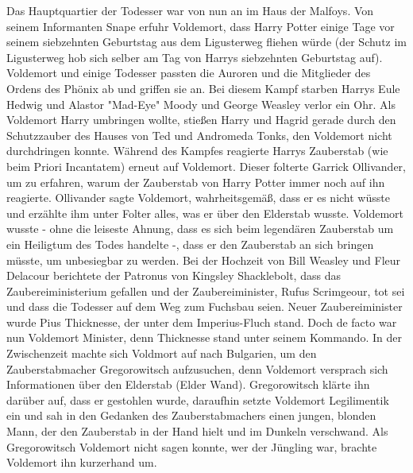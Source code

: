 \documentclass[a4paper, 10pt]{article}
\begin{document}
\newline
Das Hauptquartier der Todesser war von nun an im Haus der Malfoys. Von seinem Informanten Snape erfuhr Voldemort, dass Harry Potter einige Tage vor seinem siebzehnten Geburtstag aus dem Ligusterweg fliehen würde (der Schutz im Ligusterweg hob sich selber am Tag von Harrys siebzehnten Geburtstag auf). Voldemort und einige Todesser passten die Auroren und die Mitglieder des Ordens des Phönix ab und griffen sie an. Bei diesem Kampf starben Harrys Eule Hedwig und Alastor "Mad-Eye" Moody und George Weasley verlor ein Ohr. Als Voldemort Harry umbringen wollte, stießen Harry und Hagrid gerade durch den Schutzzauber des Hauses von Ted und Andromeda Tonks, den Voldemort nicht durchdringen konnte.
\vspace{10pt}
\newline
Während des Kampfes reagierte Harrys Zauberstab (wie beim Priori Incantatem) erneut auf Voldemort. Dieser folterte Garrick Ollivander, um zu erfahren, warum der Zauberstab von Harry Potter immer noch auf ihn reagierte. Ollivander sagte Voldemort, wahrheitsgemäß, dass er es nicht wüsste und erzählte ihm unter Folter alles, was er über den Elderstab wusste. Voldemort wusste - ohne die leiseste Ahnung, dass es sich beim legendären Zauberstab um ein Heiligtum des Todes handelte -, dass er den Zauberstab an sich bringen müsste, um unbesiegbar zu werden.
\vspace{10pt}
\newline
Bei der Hochzeit von Bill Weasley und Fleur Delacour berichtete der Patronus von Kingsley Shacklebolt, dass das Zaubereiministerium gefallen und der Zaubereiminister, Rufus Scrimgeour, tot sei und dass die Todesser auf dem Weg zum Fuchsbau seien.
\vspace{10pt}
\newline
Neuer Zaubereiminister wurde Pius Thicknesse, der unter dem Imperius-Fluch stand. Doch de facto war nun Voldemort Minister, denn Thicknesse stand unter seinem Kommando.
\vspace{10pt}
\newline
In der Zwischenzeit machte sich Voldmort auf nach Bulgarien, um den Zauberstabmacher Gregorowitsch aufzusuchen, denn Voldemort versprach sich Informationen über den Elderstab (Elder Wand). Gregorowitsch klärte ihn darüber auf, dass er gestohlen wurde, daraufhin setzte Voldemort Legilimentik ein und sah in den Gedanken des Zauberstabmachers einen jungen, blonden Mann, der den Zauberstab in der Hand hielt und im Dunkeln verschwand. Als Gregorowitsch Voldemort nicht sagen konnte, wer der Jüngling war, brachte Voldemort ihn kurzerhand um.
\end{document}

